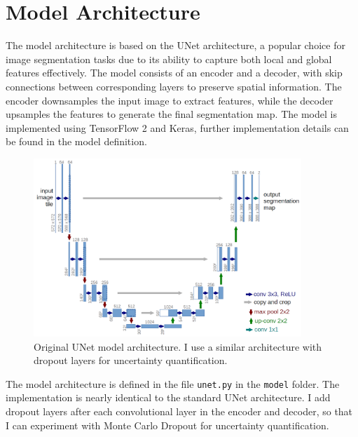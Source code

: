 \documentclass{article}
\begin{document}
\section{Model Architecture}
The model architecture is based on the UNet architecture, a popular choice for image segmentation tasks
due to its ability to capture both local and global features effectively. The model consists of an encoder
and a decoder, with skip connections between corresponding layers to preserve spatial information. The
encoder downsamples the input image to extract features, while the decoder upsamples the features to
generate the final segmentation map. The model is implemented using TensorFlow 2 and Keras, further
implementation details can be found in the model definition.

\begin{figure}[h]
    \centering
    \includegraphics[width=0.9\textwidth]{../images/unet.png}
    \caption{Original UNet model architecture. I use a similar architecture with dropout layers for uncertainty quantification.} 
    \label{fig:unet_architecture}
\end{figure}
\vspace{1em}

The model architecture is defined in the file \texttt{unet.py} in the \texttt{model} folder. The implementation
is nearly identical to the standard UNet architecture. I add dropout layers after each convolutional layer
in the encoder and decoder, so that I can experiment with Monte Carlo Dropout for uncertainty quantification.

\end{document}
